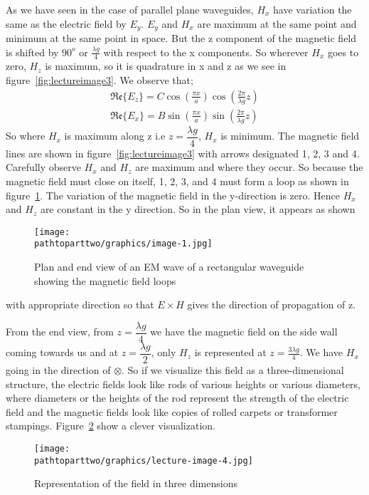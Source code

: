 As we have seen in the case of parallel plane waveguides, $H_{x}$ have variation the same as the electric field by $E_{y}$. $E_{y}$ and $H_{x}$ are maximum at the same point and minimum at the same point in space. But the z component of the magnetic field is shifted by $90^{o}$ or $\frac{\lambda g}{4}$ with respect to the x components. So wherever $H_{x}$ goes to zero, $H_{z}$ is maximum, so it is quadrature in x and z as we see in figure~\ref{fig:lectureimage3}. We observe that;
\begin{align}
\mathfrak{Re}\{E_z\} = C\cos(\frac{\pi x}{a})\cos(\frac{2\pi}{\lambda g}z)\\
\mathfrak{Re}\{E_{x}\} = B\sin(\frac{\pi x}{a})\sin(\frac{2\pi}{\lambda g}z)
\end{align}
So where $H_{x}$ is maximum along z i.e  $z=\dfrac{\lambda g}{4}$, $H_{x}$ is minimum. The magnetic field lines are shown in figure~\ref{fig:lectureimage3} with arrows designated 1, 2, 3 and 4. Carefully observe $H_{x}$ and $H_{z}$ are maximum and where they occur. So because the magnetic field must close on itself, 1, 2, 3, and 4 must form a loop as shown in figure~\ref{fig:image1}. The variation of the magnetic field in the y-direction is zero. Hence $H_{x}$ and $H_{z}$ are constant in the y direction. So in the plan view, it appears as shown 
\begin{figure}[h]
\centering
\texttt{[image: \\pathtoparttwo/graphics/image-1.jpg]}
\label{fig:image1}
\caption{Plan and end view of an EM wave of a rectangular waveguide showing the magnetic field loops}
\end{figure}
with appropriate direction so that $E\times H$ gives the direction of propagation of z. 

From the end view, from $z=\dfrac{\lambda g}{4}$ we have the magnetic field on the side wall coming towards us and at $z=\dfrac{\lambda g}{2}$, only $H_{z}$ is represented at $z=\frac{3\lambda g}{4}$. We have $H_{x}$ going in the direction of $\otimes$. So if we visualize this field as a three-dimensional structure, the electric fields look like rods of various heights or various diameters, where diameters or the heights of the rod represent the strength of the electric field and the magnetic fields look like copies of rolled carpets or transformer stampings. Figure~\ref{fig:lectureimage4} show a clever visualization.
\begin{figure}[h]
\centering
\texttt{[image: \\pathtoparttwo/graphics/lecture-image-4.jpg]}
\label{fig:lectureimage4}
\caption{Representation of the field in three dimensions}
\end{figure}
	
